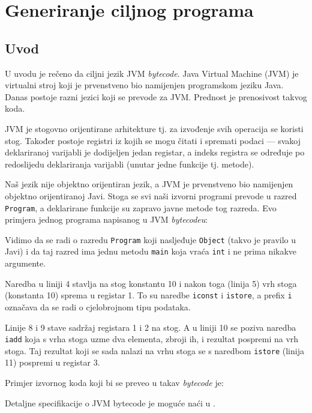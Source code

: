 \chapter{Generiranje ciljnog programa}

\section{Uvod}

U uvodu je rečeno da ciljni jezik JVM \emph{bytecode}. Java Virtual Machine (JVM) je virtualni stroj koji je prvenstveno
bio namijenjen programskom jeziku Java. Danas postoje razni jezici koji se prevode za JVM. Prednost je prenosivost
takvog koda.

JVM je stogovno orijentirane arhitekture tj. za izvođenje svih operacija se koristi stog. Također postoje 
registri iz kojih se mogu čitati i spremati podaci --- svakoj deklariranoj varijabli je dodijeljen jedan registar, a
indeks registra se određuje po redoslijedu deklariranja varijabli (unutar jedne funkcije tj. metode). 

Naš jezik nije objektno orijentiran jezik, a JVM je prvenstveno bio namijenjen objektno orijentiranoj Javi. Stoga
se svi naši izvorni programi prevode u razred \texttt{Program}, a deklarirane funkcije su zapravo javne metode
tog razreda. Evo primjera jednog programa napisanog u JVM \emph{bytecodeu}:



Vidimo da se radi o razredu \texttt{Program} koji nasljeđuje \texttt{Object} (takvo je pravilo u Javi)
i da taj razred ima jednu metodu \texttt{main} koja vraća \texttt{int} i ne prima nikakve argumente.

Naredba u liniji 4 stavlja na stog konstantu 10 i nakon toga (linija 5) vrh stoga (konstanta 10) sprema u registar 1.
To su naredbe \texttt{iconst} i \texttt{istore}, a prefix \texttt{i} označava da se radi o cjelobrojnom tipu podataka.

Linije 8 i 9 stave sadržaj registara 1 i 2 na stog. A u liniji 10 se poziva naredba \texttt{iadd} koja
s vrha stoga uzme dva elementa, zbroji ih, i rezultat pospremi na vrh stoga. Taj rezultat koji se sada
nalazi na vrhu stoga se s naredbom \texttt{istore} (linija 11) pospremi u registar 3.

Primjer izvornog koda koji bi se preveo u takav \emph{bytecode} je:



Detaljne specifikacije o JVM bytecode je moguće naći u \cite{jvm}.

